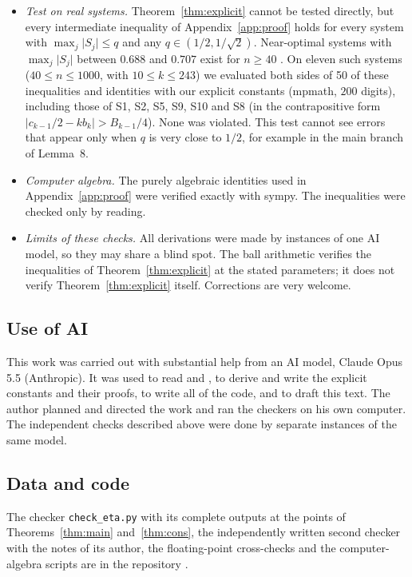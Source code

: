 \documentclass[11pt]{amsart}
\theoremstyle{remark}
\theoremstyle{plain}
\newcommand{\abs}[1]{\lvert #1\rvert}
\begin{document}
\begin{itemize}[leftmargin=*]
\item \emph{Test on real systems.} Theorem~\ref{thm:explicit} cannot be tested directly, but every intermediate inequality of Appendix~\ref{app:proof} holds for every system with $\max_j\abs{S_j}\le q$ and any $q\in(1/2,1/\sqrt2)$. Near-optimal systems with $\max_j\abs{S_j}$ between $0.688$ and $0.707$ exist for $n\ge40$ \cite{CG96,Cert}. On eleven such systems ($40\le n\le1000$, with $10\le k\le243$) we evaluated both sides of 50 of these inequalities and identities with our explicit constants (mpmath, $200$ digits), including those of S1, S2, S5, S9, S10 and S8 (in the contrapositive form $\abs{c_{k-1}/2-kb_k}>B_{k-1}/4$). None was violated. This test cannot see errors that appear only when $q$ is very close to $1/2$, for example in the main branch of Lemma~8.
\item \emph{Computer algebra.} The purely algebraic identities used in Appendix~\ref{app:proof} were verified exactly with sympy. The inequalities were checked only by reading.
\item \emph{Limits of these checks.} All derivations were made by instances of one AI model, so they may share a blind spot. The ball arithmetic verifies the inequalities of Theorem~\ref{thm:explicit} at the stated parameters; it does not verify Theorem~\ref{thm:explicit} itself. Corrections are very welcome.
\end{itemize}

\subsection*{Use of AI}
This work was carried out with substantial help from an AI model, Claude Opus 5.5 (Anthropic). It was used to read \cite{Bir00b} and \cite{Bir94}, to derive and write the explicit constants and their proofs, to write all of the code, and to draft this text. The author planned and directed the work and ran the checkers on his own computer. The independent checks described above were done by separate instances of the same model.

\subsection*{Data and code}
The checker \texttt{check\_eta.py} with its complete outputs at the points of Theorems~\ref{thm:main} and~\ref{thm:cons}, the independently written second checker with the notes of its author, the floating-point cross-checks and the computer-algebra scripts are in the repository \cite{Rep}.
\end{document}
